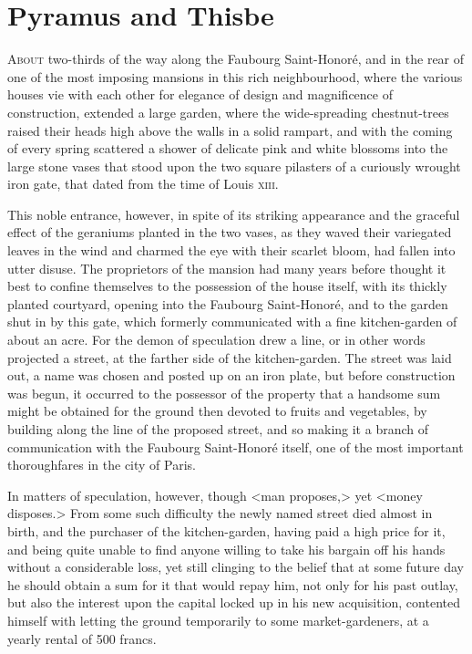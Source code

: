 \chapter{Pyramus and Thisbe} 

 \lettrine{A}{bout} two-thirds of the way along the Faubourg Saint-Honoré, and in the rear of one of the most imposing mansions in this rich neighbourhood, where the various houses vie with each other for elegance of design and magnificence of construction, extended a large garden, where the wide-spreading chestnut-trees raised their heads high above the walls in a solid rampart, and with the coming of every spring scattered a shower of delicate pink and white blossoms into the large stone vases that stood upon the two square pilasters of a curiously wrought iron gate, that dated from the time of Louis \textsc{xiii.} 

 This noble entrance, however, in spite of its striking appearance and the graceful effect of the geraniums planted in the two vases, as they waved their variegated leaves in the wind and charmed the eye with their scarlet bloom, had fallen into utter disuse. The proprietors of the mansion had many years before thought it best to confine themselves to the possession of the house itself, with its thickly planted courtyard, opening into the Faubourg Saint-Honoré, and to the garden shut in by this gate, which formerly communicated with a fine kitchen-garden of about an acre. For the demon of speculation drew a line, or in other words projected a street, at the farther side of the kitchen-garden. The street was laid out, a name was chosen and posted up on an iron plate, but before construction was begun, it occurred to the possessor of the property that a handsome sum might be obtained for the ground then devoted to fruits and vegetables, by building along the line of the proposed street, and so making it a branch of communication with the Faubourg Saint-Honoré itself, one of the most important thoroughfares in the city of Paris. 

 In matters of speculation, however, though <man proposes,> yet <money disposes.> From some such difficulty the newly named street died almost in birth, and the purchaser of the kitchen-garden, having paid a high price for it, and being quite unable to find anyone willing to take his bargain off his hands without a considerable loss, yet still clinging to the belief that at some future day he should obtain a sum for it that would repay him, not only for his past outlay, but also the interest upon the capital locked up in his new acquisition, contented himself with letting the ground temporarily to some market-gardeners, at a yearly rental of 500 francs. 

